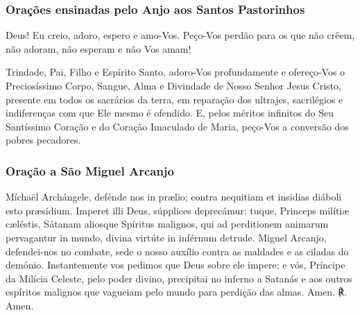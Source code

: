 \subsubsection{Orações ensinadas pelo Anjo aos Santos Pastorinhos}
\begin{nscenter}
{}
\end{nscenter}

Deus! Eu creio, adoro, espero e amo-Vos. Peço-Vos perdão para os que não crêem, não adoram, não esperam e não Vos amam!

\emph{}

\begin{nscenter}
{}
\end{nscenter}

Trindade, Pai, Filho e Espírito Santo, adoro-Vos profundamente e ofereço-Vos o Preciosíssimo Corpo, Sangue, Alma e Divindade de Nosso Senhor Jesus Cristo, presente em todos os sacrários da terra, em reparação dos ultrajes, sacrilégios e indiferenças com que Ele mesmo é ofendido. E, pelos méritos infinitos do Seu Santíssimo Coração e do Coração Imaculado de Maria, peço-Vos a conversão dos pobres pecadores.

\emph{}

\subsubsection{Oração a São Miguel Arcanjo}
\begin{paracol}{2}
Míchaël Archángele, defénde nos in prælio; contra nequitiam et insidias diáboli esto præsídium. Imperet illi Deus, súpplices deprecámur: tuque, Princeps milítiæ cæléstis, Sátanam aliosque Spíritus malignos, qui ad perditionem animarum pervagantur in mundo, divina virtúte in inférnum detrude.
\switchcolumn
{}Miguel Arcanjo, defendei-nos no combate, sede o nosso auxílio contra as maldades e as ciladas do demónio. Instantemente vos pedimos que Deus sobre ele impere; e vós, Príncipe da Milícia Celeste, pelo poder divino, precipitai no inferno a Satanás e aos outros espíritos malignos que vagueiam pelo mundo para perdição das almas.
 Amen.
\switchcolumn
{\redx ℟.} Amen.
\end{paracol}

